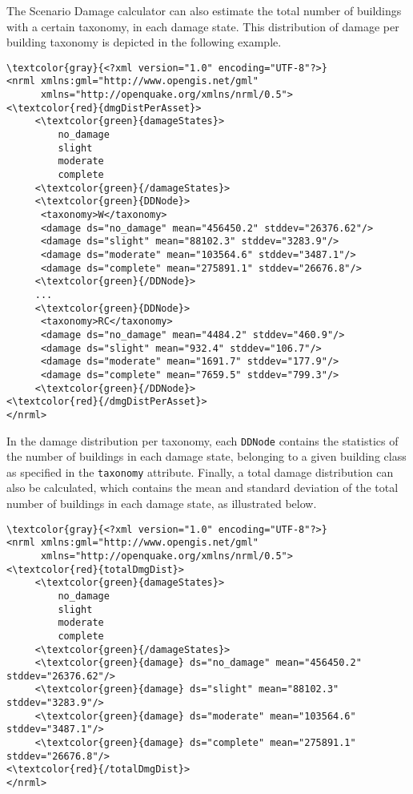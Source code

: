The Scenario Damage calculator can also estimate the total number of buildings
with a certain \gls{taxonomy}, in each damage state. This  distribution of
damage per building \gls{taxonomy} is depicted in the following example.

\begin{Verbatim}[frame=single, commandchars=\\\{\}, samepage=false]
\textcolor{gray}{<?xml version="1.0" encoding="UTF-8"?>}
<nrml xmlns:gml="http://www.opengis.net/gml"
      xmlns="http://openquake.org/xmlns/nrml/0.5">
<\textcolor{red}{dmgDistPerAsset}>
     <\textcolor{green}{damageStates}>
         no_damage
         slight
         moderate
         complete
     <\textcolor{green}{/damageStates}>
     <\textcolor{green}{DDNode}>
      <taxonomy>W</taxonomy>
      <damage ds="no_damage" mean="456450.2" stddev="26376.62"/>
      <damage ds="slight" mean="88102.3" stddev="3283.9"/>
      <damage ds="moderate" mean="103564.6" stddev="3487.1"/>
      <damage ds="complete" mean="275891.1" stddev="26676.8"/>
     <\textcolor{green}{/DDNode}>
     ...
     <\textcolor{green}{DDNode}>
      <taxonomy>RC</taxonomy>
      <damage ds="no_damage" mean="4484.2" stddev="460.9"/>
      <damage ds="slight" mean="932.4" stddev="106.7"/>
      <damage ds="moderate" mean="1691.7" stddev="177.9"/>
      <damage ds="complete" mean="7659.5" stddev="799.3"/>
     <\textcolor{green}{/DDNode}>
<\textcolor{red}{/dmgDistPerAsset}>
</nrml>
\end{Verbatim}

In the damage distribution per \gls{taxonomy}, each \Verb+DDNode+ contains the
statistics of the number of buildings in each damage state, belonging to a
given building class as specified in the \Verb+taxonomy+ attribute. Finally, a
total damage distribution can also be calculated, which contains the mean and
standard deviation of the total number of buildings in each damage state, as
illustrated below.

\begin{Verbatim}[frame=single, commandchars=\\\{\}, samepage=false]
\textcolor{gray}{<?xml version="1.0" encoding="UTF-8"?>}
<nrml xmlns:gml="http://www.opengis.net/gml"
      xmlns="http://openquake.org/xmlns/nrml/0.5">
<\textcolor{red}{totalDmgDist}>
     <\textcolor{green}{damageStates}>
         no_damage
         slight
         moderate
         complete
     <\textcolor{green}{/damageStates}>
     <\textcolor{green}{damage} ds="no_damage" mean="456450.2" stddev="26376.62"/>
     <\textcolor{green}{damage} ds="slight" mean="88102.3" stddev="3283.9"/>
     <\textcolor{green}{damage} ds="moderate" mean="103564.6" stddev="3487.1"/>
     <\textcolor{green}{damage} ds="complete" mean="275891.1" stddev="26676.8"/>
<\textcolor{red}{/totalDmgDist}>
</nrml>
\end{Verbatim}

